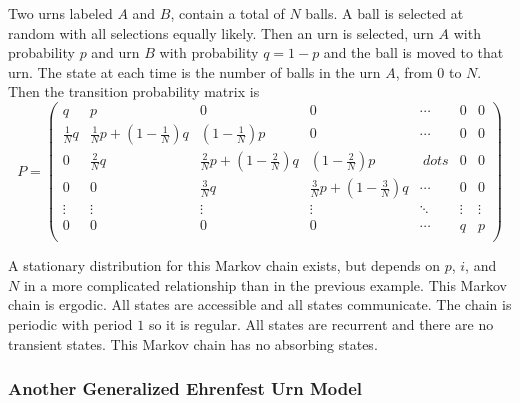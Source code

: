 \documentclass[12pt]{article}
\begin{document}
Two urns labeled \( A \) and \( B \), contain a total of \( N \) balls.
A ball is selected at random with all selections equally likely.  Then
an urn is selected, urn \( A \) with probability \( p \) and urn \( B \)
with probability \( q = 1-p \) and the ball is moved to that urn.  The
state at each time is the number of balls in the urn \( A \), from \( 0 \)
to \( N \).  Then the transition probability matrix is
\[
    P =
    \begin{pmatrix}
        q & p & 0 & 0 & \cdots & 0 & 0 \\
        \frac{1}{N} q & \frac{1}{N}p + \left( 1-\frac{1}{N} \right) q &\left
        ( 1-\frac{1}{N} \right) p & 0 & \cdots & 0 & 0 \\
        0 & \frac{2}{N} q &\frac{2}{N} p + \left( 1-\frac{2}{N} \right)
        q &\left( 1-\frac{2}{N} \right) p & \ dots & 0 & 0 \\
        0 & 0 & \frac{3}{N} q & \frac{3}{N} p + \left( 1-\frac{3}{N}
        \right) q & \cdots & 0 & 0 \\
        \vdots & \vdots & \vdots & \vdots & \ddots & \vdots & \vdots \\
        0 & 0 & 0 & 0 & \cdots & q & p \\
    \end{pmatrix}
\]

A stationary distribution for this Markov chain exists, but depends on \(
p \), \( i \), and \( N \) in a more complicated relationship than in
the previous example.  This Markov chain is ergodic.  All states are
accessible and all states communicate.  The chain is periodic with
period \( 1 \) so it is regular.  All states are recurrent and there are
no transient states.  This Markov chain has no absorbing states.

\subsubsection*{Another Generalized Ehrenfest Urn Model}
\end{document}
